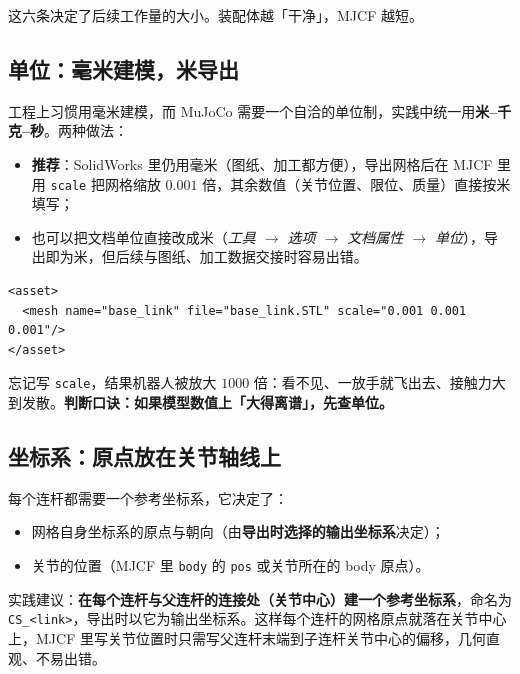这六条决定了后续工作量的大小。装配体越「干净」，MJCF 越短。

\subsection{单位：毫米建模，米导出}

工程上习惯用毫米建模，而 MuJoCo 需要一个自洽的单位制，实践中统一用\textbf{米--千克--秒}。两种做法：

\begin{itemize}
	\item \textbf{推荐}：SolidWorks 里仍用毫米（图纸、加工都方便），导出网格后在 MJCF 里用 \texttt{scale} 把网格缩放 $0.001$ 倍，其余数值（关节位置、限位、质量）直接按米填写；
	\item 也可以把文档单位直接改成米（\textit{工具 $\rightarrow$ 选项 $\rightarrow$ 文档属性 $\rightarrow$ 单位}），导出即为米，但后续与图纸、加工数据交接时容易出错。
\end{itemize}

\begin{lstlisting}[style=xml]
<asset>
  <mesh name="base_link" file="base_link.STL" scale="0.001 0.001 0.001"/>
</asset>
\end{lstlisting}

\begin{warnbox}[最常见的一个错误]
	忘记写 \texttt{scale}，结果机器人被放大 $1000$ 倍：看不见、一放手就飞出去、接触力大到发散。\textbf{判断口诀：如果模型数值上「大得离谱」，先查单位。}
\end{warnbox}

\subsection{坐标系：原点放在关节轴线上}

每个连杆都需要一个参考坐标系，它决定了：

\begin{itemize}
	\item 网格自身坐标系的原点与朝向（由\textbf{导出时选择的输出坐标系}决定）；
	\item 关节的位置（MJCF 里 \texttt{body} 的 \texttt{pos} 或关节所在的 body 原点）。
\end{itemize}

实践建议：\textbf{在每个连杆与父连杆的连接处（关节中心）建一个参考坐标系}，命名为 \texttt{CS\_<link>}，导出时以它为输出坐标系。这样每个连杆的网格原点就落在关节中心上，MJCF 里写关节位置时只需写父连杆末端到子连杆关节中心的偏移，几何直观、不易出错。

